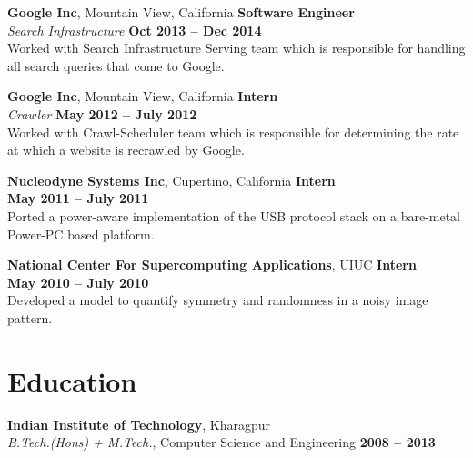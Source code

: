 \documentclass[margin,line]{resume}
\begin{document}
\begin{resume}
    \textbf{Google Inc}, Mountain View, California \hfill \textbf{Software Engineer} \vspace{2mm}\\\vspace{1mm}%
    \textsl{Search Infrastructure} \hfill \textbf{Oct 2013 -- Dec 2014}\vspace{1.5mm}\\\vspace{0mm}%
   Worked with Search Infrastructure Serving team which is responsible for handling all search queries that come to Google. 

    \textbf{Google Inc}, Mountain View, California \hfill \textbf{Intern} \vspace{2mm}\\\vspace{1mm}%
    \textsl{Crawler} \hfill \textbf{May 2012 -- July 2012}\\
    Worked with Crawl-Scheduler team which is responsible for determining the rate at which a website is recrawled by Google.

    \textbf{Nucleodyne Systems Inc}, Cupertino, California \hfill \textbf{Intern} \vspace{2mm}\\\vspace{1mm}%
    \hfill \textbf{May 2011 -- July 2011}\\
    Ported a power-aware implementation of the USB protocol stack on a bare-metal Power-PC based platform.

   \textbf{National Center For Supercomputing Applications}, UIUC \hfill \textbf{Intern} \vspace{2mm}\\\vspace{1mm}%
    \hfill \textbf{May 2010 -- July 2010}\\
    Developed a model to quantify symmetry and randomness in a noisy image pattern.

    \section{\mysidestyle Education}

    \textbf{Indian Institute of Technology}, Kharagpur \vspace{2mm}\\\vspace{1mm}%
    \textsl{B.Tech.(Hons) + M.Tech.}, Computer Science and Engineering \hfill \textbf{ 2008 -- 2013}\vspace{-3mm}\\\vspace{-1mm}%


\end{resume}
\end{document}
